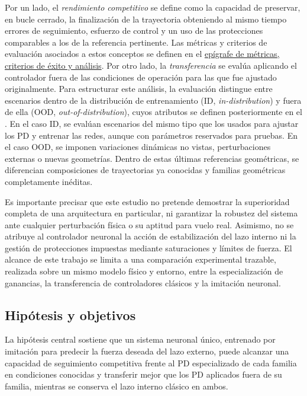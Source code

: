 Por un lado, el \emph{rendimiento competitivo} se define como la capacidad de
preservar, en bucle cerrado, la finalización de la trayectoria obteniendo al mismo 
tiempo  errores de seguimiento, esfuerzo de control y un uso de las protecciones
comparables a los de la referencia pertinente. Las métricas y criterios de evaluación 
asociados a estos conceptos se definen en el
\hyperref[subsubsec:metricas-criterios]{epígrafe de métricas, criterios de
éxito y análisis}. Por otro lado, la \emph{transferencia} se evalúa aplicando el
controlador fuera de las condiciones de operación para las que fue ajustado
originalmente. Para estructurar este análisis, la evaluación distingue entre
escenarios dentro de la distribución de entrenamiento (ID,
\textit{in-distribution}) y fuera de ella (OOD, \textit{out-of-distribution}),
cuyos atributos se definen posteriormente en el
.
En el caso ID, se evalúan escenarios del mismo tipo que los usados para ajustar los
PD y entrenar las redes, aunque con parámetros reservados para pruebas. En el caso OOD,
se imponen variaciones dinámicas no vistas, perturbaciones externas o nuevas geometrías.
Dentro de estas últimas referencias geométricas, se diferencian composiciones
de trayectorias ya conocidas y familias geométricas completamente inéditas.

Es importante precisar que este estudio no pretende demostrar la superioridad completa 
de una arquitectura en particular, ni garantizar la robustez del sistema ante cualquier 
perturbación física o su aptitud para vuelo real. Asimismo, no se atribuye al controlador
neuronal la acción de estabilización del lazo interno ni la gestión de protecciones impuestas
mediante saturaciones y límites de fuerza. El alcance de este trabajo se limita a una comparación
experimental trazable, realizada sobre un mismo modelo físico y entorno, entre la especialización
de ganancias, la transferencia de controladores clásicos y la imitación neuronal.

\subsection{Hipótesis y objetivos}
\label{subsec:hipotesis-objetivos}

La hipótesis central sostiene que un sistema neuronal único, entrenado por
imitación para predecir la fuerza deseada del lazo externo, puede alcanzar una
capacidad de seguimiento competitiva frente al PD especializado de cada familia
en condiciones conocidas y transferir mejor que los PD aplicados fuera de su
familia, mientras se conserva el lazo interno clásico en ambos.

